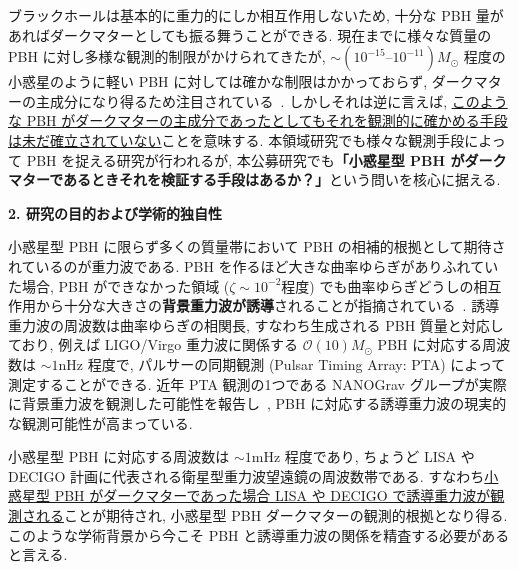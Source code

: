 \documentclass[11pt,a4paper,uplatex,dvipdfmx]{ujarticle} 		%
\newcommand{\研究課題名}{曲率ゆらぎの統計と原始ブラックホール量の精密対応}
\newcommand{\研究機関名}{名古屋大学}
\newcommand{\研究代表者氏名}{多田祐一郎}
\newcommand{\研究期間の最終元号年度}{4}  %
\renewcommand{\emph}[1]{{\sffamily\gtfamily\bfseries #1}}
\newcommand{\calO}{\mathcal{O}}
\begin{document}
ブラックホールは基本的に重力的にしか相互作用しないため, 十分な PBH 量があればダークマターとしても振る舞うことができる.
現在までに様々な質量の PBH に対し多様な観測的制限がかけられてきたが, $\sim(10^{-15}\text{--}10^{-11})M_\odot$ 程度の小惑星のように軽い PBH に対しては確かな制限はかかっておらず, ダークマターの主成分になり得るため注目されている~\cite{Carr:2016drx}.
しかしそれは逆に言えば, \ul{このような PBH がダークマターの主成分であったとしてもそれを観測的に確かめる手段は未だ確立されていない}ことを意味する.
本領域研究でも様々な観測手段によって PBH を捉える研究が行われるが,
本公募研究でも\emph{「小惑星型 PBH がダークマターであるときそれを検証する手段はあるか？」}という問いを核心に据える.




\begin{mdframed}[roundcorner=0.5zw,
	innertopmargin=0.8zw,innerbottommargin=0.8zw,
	linecolor=black!50,linewidth=0.2zw,
	backgroundcolor=black!10]
	{\bfseries\gtfamily\sffamily\large 2. 研究の目的および学術的独自性}
\end{mdframed}

\noindent
小惑星型 PBH に限らず多くの質量帯において PBH の相補的根拠として期待されているのが重力波である.
PBH を作るほど大きな曲率ゆらぎがありふれていた場合, PBH ができなかった領域 ($\zeta\sim10^{-2}$程度) でも曲率ゆらぎどうしの相互作用から十分な大きさの\emph{背景重力波が誘導}されることが指摘されている~\cite{Saito:2008jc}.
誘導重力波の周波数は曲率ゆらぎの相関長, すなわち生成される PBH 質量と対応しており, 
例えば LIGO/Virgo 重力波に関係する $\calO(10)M_\odot$ PBH に対応する周波数は $\sim1\mathrm{nHz}$ 程度で,
パルサーの同期観測 (Pulsar Timing Array: PTA) によって測定することができる.
近年 PTA 観測の1つである NANOGrav グループが実際に背景重力波を観測した可能性を報告し~\cite{Arzoumanian:2020vkk},
PBH に対応する誘導重力波の現実的な観測可能性が高まっている.

小惑星型 PBH に対応する周波数は $\sim1\mathrm{mHz}$ 程度であり,
ちょうど LISA や DECIGO 計画に代表される衛星型重力波望遠鏡の周波数帯である.
すなわち\ul{小惑星型 PBH がダークマターであった場合 LISA や DECIGO で誘導重力波が観測される}ことが期待され, 
小惑星型 PBH ダークマターの観測的根拠となり得る.
このような学術背景から今こそ PBH と誘導重力波の関係を精査する必要があると言える.
\end{document}
